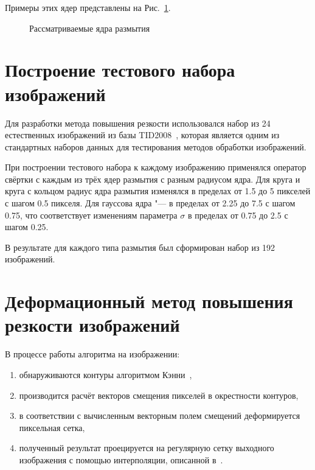 Примеры этих ядер представлены на Рис.~\ref{fig:warping-psf-examples}. 

\begin{figure}[ht]
	\caption{Рассматриваемые ядра размытия}
	\label{fig:warping-psf-examples}
\end{figure}

\section{Построение тестового набора изображений}

Для разработки метода повышения резкости использовался набор из 24 естественных изображений из базы TID2008~\cite{ponomarenko2009tid2008}, которая является одним из стандартных наборов данных для тестирования методов обработки изображений.

При построении тестового набора к каждому изображению применялся оператор свёртки с каждым из трёх ядер размытия с разным радиусом ядра. Для круга и круга с кольцом радиус ядра размытия изменялся в пределах от 1.5 до 5 пикселей с шагом 0.5 пикселя. Для гауссова ядра "--- в пределах от 2.25 до 7.5 с шагом 0.75, что соответствует изменениям параметра $\sigma$ в пределах от 0.75 до 2.5 с шагом 0.25.

В результате для каждого типа размытия был сформирован набор из 192 изображений.

\section{Деформационный метод повышения резкости изображений}

В процессе работы алгоритма на изображении:
\begin{enumerate}[beginpenalty=10000]
	\item обнаруживаются контуры алгоритмом Кэнни~\cite{canny1986computational},
	\item производится расчёт векторов смещения пикселей в окрестности контуров,
	\item в соответствии с вычисленным векторным полем смещений деформируется пиксельная сетка,
	\item полученный результат проецируется на регулярную сетку выходного изображения с помощью интерполяции, описанной в~\cite{krylov2014gridwarping}.
\end{enumerate}

